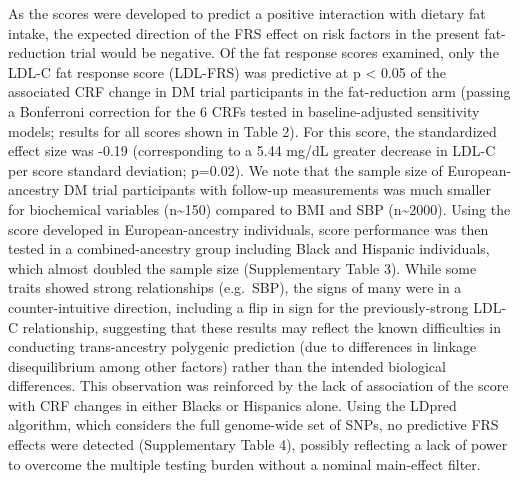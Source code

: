 \documentclass[]{article}
\begin{document}
As the scores were developed to predict a positive interaction with
dietary fat intake, the expected direction of the FRS effect on risk
factors in the present fat-reduction trial would be negative. Of the fat
response scores examined, only the LDL-C fat response score (LDL-FRS)
was predictive at p \textless{} 0.05 of the associated CRF change in DM
trial participants in the fat-reduction arm (passing a Bonferroni
correction for the 6 CRFs tested in baseline-adjusted sensitivity
models; results for all scores shown in Table 2). For this score, the
standardized effect size was -0.19 (corresponding to a 5.44 mg/dL
greater decrease in LDL-C per score standard deviation; p=0.02). We note
that the sample size of European-ancestry DM trial participants with
follow-up measurements was much smaller for biochemical variables
(n\textasciitilde{}150) compared to BMI and SBP
(n\textasciitilde{}2000). Using the score developed in European-ancestry
individuals, score performance was then tested in a combined-ancestry
group including Black and Hispanic individuals, which almost doubled the
sample size (Supplementary Table 3). While some traits showed strong
relationships (e.g.~SBP), the signs of many were in a counter-intuitive
direction, including a flip in sign for the previously-strong LDL-C
relationship, suggesting that these results may reflect the known
difficulties in conducting trans-ancestry polygenic prediction (due to
differences in linkage disequilibrium among other factors) rather than
the intended biological differences. This observation was reinforced by
the lack of association of the score with CRF changes in either Blacks
or Hispanics alone. Using the LDpred algorithm, which considers the full
genome-wide set of SNPs, no predictive FRS effects were detected
(Supplementary Table 4), possibly reflecting a lack of power to overcome
the multiple testing burden without a nominal main-effect filter.
\end{document}
